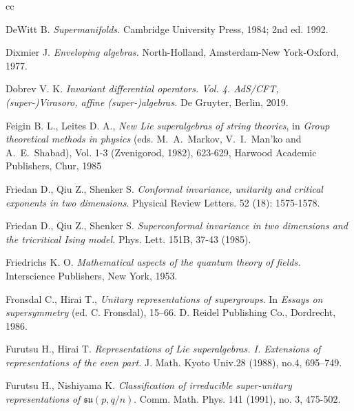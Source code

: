 \documentclass[]{amsart}
\begin{document}
\begin{thebibliography}{cc}
 
DeWitt B.         
{\it Supermanifolds.} 
 Cambridge University Press, 1984; 2nd ed. 1992.



Dixmier J.
{\it Enveloping algebras.}
North-Holland, Amsterdam-New York-Oxford, 1977.

Dobrev V. K.
{\it Invariant differential operators. Vol. 4.
AdS/CFT, (super-)Virasoro, affine (super-)algebras.} 
De Gruyter, Berlin, 2019.

Feigin B. L., Leites D. A.,
{\it New Lie superalgebras of string theories}, in  {\it Group theoretical methods in physics}
 (eds. M.~A.~Markov, 
V.~I.~Man'ko and A.~E.~Shabad), Vol. 1-3 (Zvenigorod, 1982), 623-629,
Harwood Academic Publishers, Chur, 1985

Friedan D., Qiu Z., Shenker S.  {\it Conformal invariance, unitarity and critical exponents in two dimensions}. Physical Review Letters. 52 (18): 1575-1578.

Friedan D., Qiu Z., Shenker S. {\it  Superconformal invariance in two dimensions and the
tricritical Ising model.} Phys. Lett. 151B, 37-43 (1985).

Friedrichs K. O.
{\it Mathematical aspects of the quantum theory of fields.}
Interscience Publishers, New York, 1953. 

Fronsdal C., Hirai T.,
{\it Unitary representations of supergroups}. In {\it Essays on supersymmetry} (ed. C. Fronsdal), 15–66.
D. Reidel Publishing Co., Dordrecht, 1986.

Furutsu H., Hirai T.
{\it Representations of Lie superalgebras. I. Extensions of representations of the even part.}
J. Math. Kyoto Univ.28 (1988), no.4, 695–749.

Furutsu H., Nishiyama K.
{\it Classification of irreducible super-unitary representations of $\mathfrak{su}(p,q/n)$}.
Comm. Math. Phys. 141 (1991), no. 3, 475-502.


 

\end{thebibliography}
\end{document}
